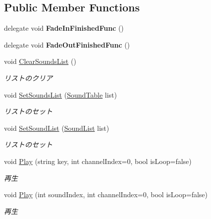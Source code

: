\subsection*{Public Member Functions}
\begin{DoxyCompactItemize}
\item 
delegate void {\bfseries Fade\+In\+Finished\+Func} ()\hypertarget{class_sound_manager_afd4c36c3c486f23f9ee6bf399444659d}{}\label{class_sound_manager_afd4c36c3c486f23f9ee6bf399444659d}

\item 
delegate void {\bfseries Fade\+Out\+Finished\+Func} ()\hypertarget{class_sound_manager_a56961e7c98925bbbed7666ce3c4ef3ab}{}\label{class_sound_manager_a56961e7c98925bbbed7666ce3c4ef3ab}

\item 
void \hyperlink{class_sound_manager_a36ec32643d2276d727460a3ab3de18df}{Clear\+Sounds\+List} ()
\begin{DoxyCompactList}\small\item\em リストのクリア \end{DoxyCompactList}\item 
void \hyperlink{class_sound_manager_a860981b17851570fd3a6d856987e48a1}{Set\+Sounds\+List} (\hyperlink{class_sound_table}{Sound\+Table} list)
\begin{DoxyCompactList}\small\item\em リストのセット \end{DoxyCompactList}\item 
void \hyperlink{class_sound_manager_ae923cec5a1bb1887a003cc2cf46ac08c}{Set\+Sound\+List} (\hyperlink{class_sound_list}{Sound\+List} list)
\begin{DoxyCompactList}\small\item\em リストのセット \end{DoxyCompactList}\item 
void \hyperlink{class_sound_manager_a8304f6c972f1b647f169f72544229f39}{Play} (string key, int channel\+Index=0, bool is\+Loop=false)
\begin{DoxyCompactList}\small\item\em 再生 \end{DoxyCompactList}\item 
void \hyperlink{class_sound_manager_a1c7c9d6ec13a3e973d6b7d35967d3e88}{Play} (int sound\+Index, int channel\+Index=0, bool is\+Loop=false)
\begin{DoxyCompactList}\small\item\em 再生 \end{DoxyCompactList}\item 

\end{DoxyCompactItemize}
